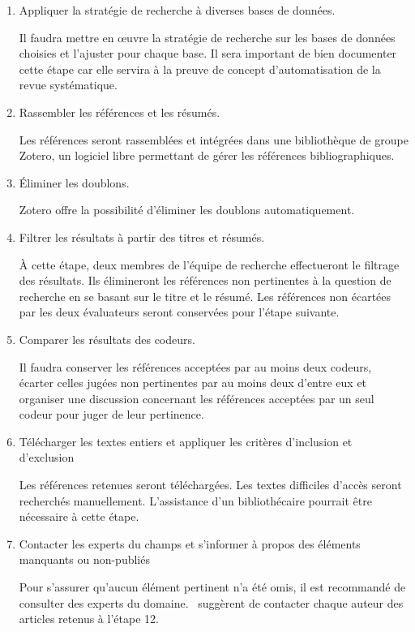 \documentclass[
  letterpaper,
]{scrbook}
\begin{document}
\begin{enumerate}
  \item Appliquer la stratégie de recherche à diverses bases de données.

    Il faudra mettre en œuvre la stratégie de recherche sur les bases de données choisies et l'ajuster pour chaque base. Il sera important de bien documenter cette étape car elle servira à la preuve de concept d'automatisation de la revue systématique.

  \item Rassembler les références et les résumés.

    Les références seront rassemblées et intégrées dans une bibliothèque de groupe Zotero, un logiciel libre permettant de gérer les références bibliographiques.

  \item Éliminer les doublons.
  
    Zotero offre la possibilité d'éliminer les doublons automatiquement.

  \item Filtrer les résultats à partir des titres et résumés.

    À cette étape, deux membres de l'équipe de recherche effectueront le filtrage des résultats. Ils élimineront les références non pertinentes à la question de recherche en se basant sur le titre et le résumé. Les références non écartées par les deux évaluateurs seront conservées pour l'étape suivante.

  \item Comparer les résultats des codeurs.

    Il faudra conserver les références acceptées par au moins deux codeurs, écarter celles jugées non pertinentes par au moins deux d'entre eux et organiser une discussion concernant les références acceptées par un seul codeur pour juger de leur pertinence.

  \item Télécharger les textes entiers et appliquer les critères d'inclusion et d'exclusion
  
    Les références retenues seront téléchargées. Les textes difficiles d'accès seront recherchés manuellement. L'assistance d'un bibliothécaire pourrait être nécessaire à cette étape.

  \item Contacter les experts du champs et s'informer à propos des éléments manquants ou non-publiés

    Pour s'assurer qu'aucun élément pertinent n'a été omis, il est recommandé de consulter des experts du domaine.~\textcite[6]{muka_etal20} suggèrent de contacter chaque auteur des articles retenus à l'étape 12.


\end{enumerate}
\end{document}
